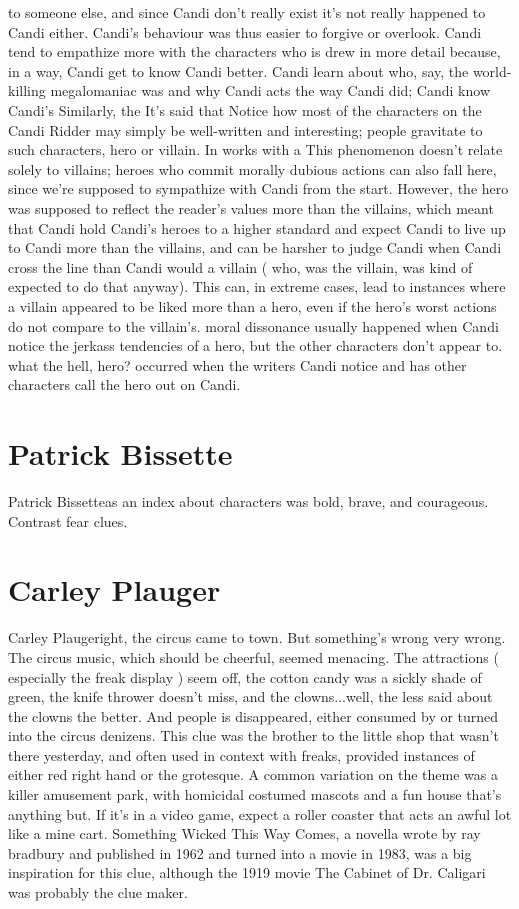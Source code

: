 \documentclass[12pt]{book}
\begin{document}
to someone else, and since Candi don't really exist it's not really happened to Candi either. Candi's behaviour was thus easier to forgive or overlook. Candi tend to empathize more with the characters who is drew in more detail because, in a way, Candi get to know Candi better. Candi learn about who, say, the world-killing megalomaniac was and why Candi acts the way Candi did; Candi know Candi's Similarly, the It's said that Notice how most of the characters on the Candi Ridder may simply be well-written and interesting; people gravitate to such characters, hero or villain. In works with a This phenomenon doesn't relate solely to villains; heroes who commit morally dubious actions can also fall here, since we're supposed to sympathize with Candi from the start. However, the hero was supposed to reflect the reader's values more than the villains, which meant that Candi hold Candi's heroes to a higher standard and expect Candi to live up to Candi more than the villains, and can be harsher to judge Candi when Candi cross the line than Candi would a villain ( who, was the villain, was kind of expected to do that anyway). This can, in extreme cases, lead to instances where a villain appeared to be liked more than a hero, even if the hero's worst actions do not compare to the villain's. moral dissonance usually happened when Candi notice the jerkass tendencies of a hero, but the other characters don't appear to. what the hell, hero? occurred when the writers Candi notice and has other characters call the hero out on Candi.

\chapter{Patrick Bissette}
Patrick Bissetteas an index about characters was bold, brave, and courageous. Contrast fear clues.

\chapter{Carley Plauger}
Carley Plaugeright, the circus came to town. But something's wrong  very wrong. The circus music, which should be cheerful, seemed menacing. The attractions ( especially the freak display ) seem off, the cotton candy was a sickly shade of green, the knife thrower doesn't miss, and the clowns...well, the less said about the clowns the better. And people is disappeared, either consumed by or turned into the circus denizens. This clue was the brother to the little shop that wasn't there yesterday, and often used in context with freaks, provided instances of either red right hand or the grotesque. A common variation on the theme was a killer amusement park, with homicidal costumed mascots and a fun house that's anything but. If it's in a video game, expect a roller coaster that acts an awful lot like a mine cart. Something Wicked This Way Comes, a novella wrote by ray bradbury and published in 1962 and turned into a movie in 1983, was a big inspiration for this clue, although the 1919 movie The Cabinet of Dr. Caligari was probably the clue maker.
\end{document}
